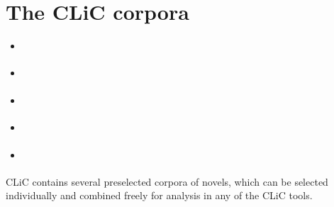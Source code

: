\documentclass[letterpaper,10pt,english]{sphinxmanual}
\begin{document}
\chapter{The CLiC corpora}
\label{\detokenize{cliccorpora:the-clic-corpora}}\label{\detokenize{cliccorpora::doc}}
\begin{sphinxShadowBox}
\begin{itemize}
\item {} 
\sphinxAtStartPar
{}\label{\detokenize{cliccorpora:id11}}{\hyperref[\detokenize{cliccorpora:available-corpora}]{}}

\item {} 
\sphinxAtStartPar
{}\label{\detokenize{cliccorpora:id12}}{\hyperref[\detokenize{cliccorpora:selecting-texts-and-corpora}]{}}

\item {} 
\sphinxAtStartPar
{}\label{\detokenize{cliccorpora:id13}}{\hyperref[\detokenize{cliccorpora:textual-subsets}]{}}

\item {} 
\sphinxAtStartPar
{}\label{\detokenize{cliccorpora:id14}}{\hyperref[\detokenize{cliccorpora:versioning-and-reproducibility}]{}}

\item {} 
\sphinxAtStartPar
{}\label{\detokenize{cliccorpora:id15}}{\hyperref[\detokenize{cliccorpora:how-to-cite-corpora}]{}}

\end{itemize}
\end{sphinxShadowBox}

\sphinxAtStartPar
CLiC contains several pre\sphinxhyphen{}selected corpora of novels, which can be
selected individually and combined freely for analysis in any of the
CLiC tools.
\end{document}
